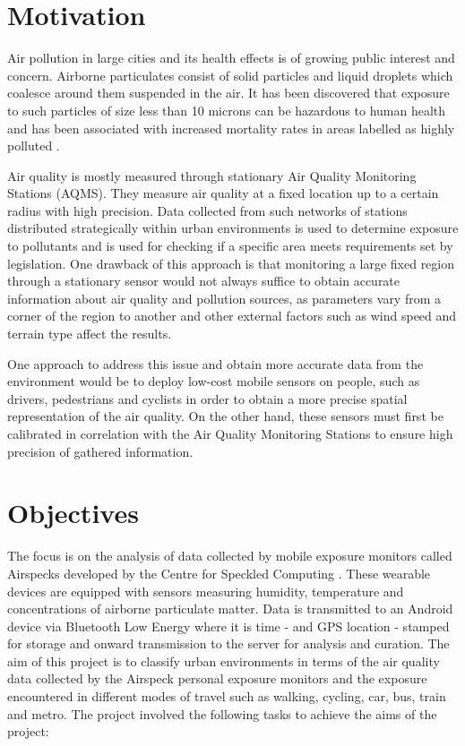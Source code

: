\documentclass[bsc,frontabs,twoside,singlespacing, parskip,deptreport]{infthesis}     %
\begin{document}
\section{Motivation}

Air pollution in large cities and its health effects is of growing public interest and concern.  Airborne particulates consist of solid particles and liquid droplets which coalesce around them suspended in the air. It has been discovered that exposure to such particles of size less than 10 microns can be hazardous to human health and has been associated with increased mortality rates in areas labelled as highly polluted \cite{Dockery1994}.

Air quality is mostly measured through stationary Air Quality Monitoring Stations (AQMS). They measure air quality at a fixed location up to a certain radius with high precision. Data collected from such networks of stations distributed strategically within urban environments is used to determine exposure to pollutants and is used for checking if a specific area meets requirements set by legislation. One drawback of this approach is that monitoring a large fixed region through a stationary sensor would not always suffice to obtain accurate information about air quality and pollution sources, as parameters vary from a corner of the region to another and other external factors such as wind speed and terrain type affect the results.

One approach to address this issue and obtain more accurate data from the environment would be to deploy low-cost mobile sensors on people, such as drivers, pedestrians and cyclists in order to obtain a more precise spatial representation of the air quality. On the other hand, these sensors must first be calibrated in correlation with the Air Quality Monitoring Stations to ensure high precision of gathered information.

\section{Objectives}

The focus is on the analysis of data collected by mobile exposure monitors called Airspecks \cite{airspeck} \cite{airspeck2} \cite{airspeck3} developed by the Centre for Speckled Computing \cite{speckled-computing}. These wearable devices are equipped with sensors measuring humidity, temperature and concentrations of airborne particulate matter. Data is transmitted to an Android device via Bluetooth Low Energy where it is time - and GPS location - stamped for storage and onward transmission to the server for analysis and curation. The aim of this project is to classify urban environments in terms of the air quality data collected by the Airspeck personal exposure monitors  and the exposure encountered in different modes of travel such as walking, cycling, car, bus, train and metro. The project involved the following tasks to achieve the aims of the project:
\end{document}
